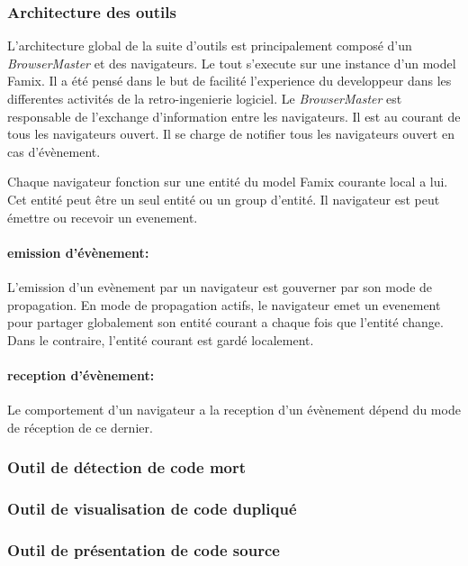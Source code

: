 \documentclass[a4paper]{article}
\newcommand{\browserMaster}{\textit{BrowserMaster} \xspace}
\begin{document}
\subsubsection{Architecture des outils }
L'architecture global  de la suite d'outils est principalement composé d'un \browserMaster et des navigateurs.
Le tout s'execute sur une instance d'un model Famix. 
Il a été pensé dans le but de facilité l'experience du developpeur dans les differentes activités de la retro-ingenierie logiciel.
Le \browserMaster est responsable de l'exchange d'information entre les navigateurs.
Il est au courant de tous les navigateurs ouvert. 
Il se charge de notifier tous les navigateurs ouvert en cas d'évènement.

Chaque navigateur fonction sur une entité du model Famix courante local a lui.
Cet entité peut être un seul entité ou un group d'entité.
Il navigateur est peut émettre ou recevoir un evenement. 
\paragraph{emission d'évènement: }L'emission d'un evènement par un navigateur est gouverner par son mode de propagation.
En mode de propagation actifs, le navigateur emet un evenement pour partager globalement son entité courant a chaque fois que l'entité change.
Dans le contraire, l'entité courant est gardé localement.

\paragraph{reception d'évènement: } Le comportement d'un navigateur a la reception d'un évènement dépend du mode de réception de ce dernier.



\subsubsection{Outil de détection de code mort}

\subsubsection{Outil de visualisation de code dupliqué}

\subsubsection{Outil de présentation de code source}
\end{document}
